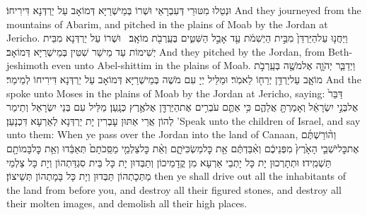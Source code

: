 {וּנְטַלוּ מִטּוּרֵי דְּעִבְרָאֵי וּשְׁרוֹ בְּמֵישְׁרַיָּא דְּמוֹאָב עַל יַרְדְּנָא דִּירִיחוֹ׃}
{And they journeyed from the mountains of Abarim, and pitched in the plains of Moab by the Jordan at Jericho.}{}
{וַיַּחֲנ֤וּ עַל\maqqaf הַיַּרְדֵּן֙ מִבֵּ֣ית הַיְשִׁמֹ֔ת עַ֖ד אָבֵ֣ל הַשִּׁטִּ֑ים בְּעַֽרְבֹ֖ת מוֹאָֽב׃ \setuma }
{וּשְׁרוֹ עַל יַרְדְּנָא מִבֵּית יְשִׁימוֹת עַד מֵישַׁר שִׁטִּין בְּמֵישְׁרַיָּא דְּמוֹאָב׃}
{And they pitched by the Jordan, from Beth-jeshimoth even unto Abel-shittim in the plains of Moab.}{}
{וַיְדַבֵּ֧ר יְהֹוָ֛ה אֶל\maqqaf מֹשֶׁ֖ה בְּעַֽרְבֹ֣ת מוֹאָ֑ב עַל\maqqaf יַרְדֵּ֥ן יְרֵח֖וֹ לֵאמֹֽר׃}
{וּמַלֵּיל יְיָ עִם מֹשֶׁה בְּמֵישְׁרַיָּא דְּמוֹאָב עַל יַרְדְּנָא דִּירִיחוֹ לְמֵימַר׃}
{And the \lord\space spoke unto Moses in the plains of Moab by the Jordan at Jericho, saying:}{}
{דַּבֵּר֙ אֶל\maqqaf בְּנֵ֣י יִשְׂרָאֵ֔ל וְאָמַרְתָּ֖ אֲלֵהֶ֑ם כִּ֥י אַתֶּ֛ם עֹבְרִ֥ים אֶת\maqqaf הַיַּרְדֵּ֖ן אֶל\maqqaf אֶ֥רֶץ כְּנָֽעַן׃}
{מַלֵּיל עִם בְּנֵי יִשְׂרָאֵל וְתֵימַר לְהוֹן אֲרֵי אַתּוּן עָבְרִין יָת יַרְדְּנָא לְאַרְעָא דִּכְנָעַן׃}
{’Speak unto the children of Israel, and say unto them: When ye pass over the Jordan into the land of Canaan,}{}
{וְה֨וֹרַשְׁתֶּ֜ם אֶת\maqqaf כׇּל\maqqaf יֹשְׁבֵ֤י הָאָ֙רֶץ֙ מִפְּנֵיכֶ֔ם וְאִ֨בַּדְתֶּ֔ם אֵ֖ת כׇּל\maqqaf מַשְׂכִּיֹּתָ֑ם וְאֵ֨ת כׇּל\maqqaf צַלְמֵ֤י מַסֵּֽכֹתָם֙ תְּאַבֵּ֔דוּ וְאֵ֥ת כׇּל\maqqaf בָּמוֹתָ֖ם תַּשְׁמִֽידוּ׃}
{וּתְתָרְכוּן יָת כָּל יָתְבֵי אַרְעָא מִן קֳדָמֵיכוֹן וְתַבְּדוּן יָת כָּל בֵּית סִגְדַּתְהוֹן וְיָת כָּל צַלְמֵי מַתְּכָתְהוֹן תַּבְּדוּן וְיָת כָּל בָּמָתְהוֹן תְּשֵׁיצוֹן׃}
{then ye shall drive out all the inhabitants of the land from before you, and destroy all their figured stones, and destroy all their molten images, and demolish all their high places.}{}
